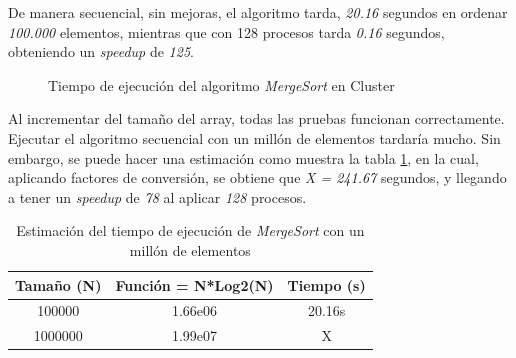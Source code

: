 		De manera secuencial, sin mejoras, el algoritmo tarda, \textit{20.16} segundos en ordenar \textit{100.000} elementos, mientras que con 128 procesos tarda \textit{0.16} segundos, obteniendo un \textit{speedup} de \textit{125}. 
		
		\begin{figure}[!h]
			\hspace{-0.07\textwidth}
			\caption{Tiempo de ejecución del algoritmo \textit{MergeSort} en Cluster}
			\label{fig:mergesort_cluster}
		\end{figure}
		
		Al incrementar del tamaño del array, todas las pruebas funcionan correctamente. Ejecutar el algoritmo secuencial con un millón de elementos tardaría mucho. Sin embargo, se puede hacer una estimación como muestra la tabla \ref{tab:estimacion_mergesort}, en la cual, aplicando factores de conversión, se obtiene que \textit{X = 241.67} segundos, y llegando a tener un \textit{speedup} de \textit{78} al aplicar \textit{128} procesos.
		
		\begin{table}[!h]
			\centering
			\begin{tabular}{|c|c|c|}
				\hline
				\rowcolor{lightgray}
				\textbf{Tamaño (N)} & \textbf{Función = N*Log2(N)} & \textbf{Tiempo (s)} \\
				\hline
				100000 & 1.66e06 & 20.16s \\
				\hline
				1000000 & 1.99e07 & X \\
				\hline
				
			\end{tabular}
			\caption{Estimación del tiempo de ejecución de \textit{MergeSort} con un millón de elementos}
			\label{tab:estimacion_mergesort}
		\end{table}
		
